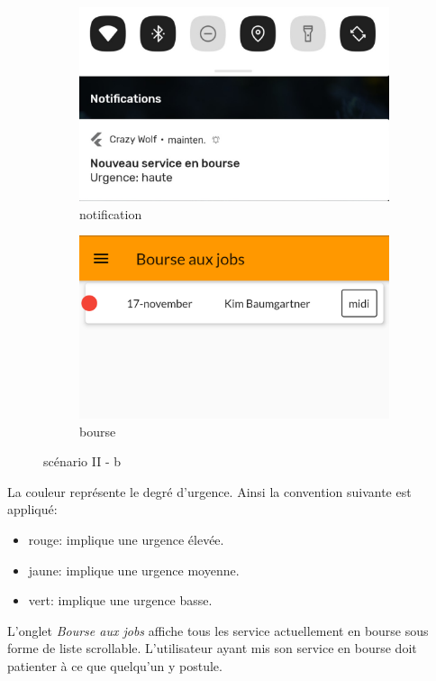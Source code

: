 \begin{figure}[!h]
    \centering
    \begin{subfigure}[]{.3\textwidth}
        \centering
        \includegraphics[width=0.9\linewidth]{screenshots/scenario_02/notification.png}
        \caption{notification}
        \label{fig:notif}
    \end{subfigure}
    \begin{subfigure}{.3\textwidth}
        \centering
        \includegraphics[width=0.9\linewidth]{screenshots/scenario_02/bourse_jobs.png}
        \caption{bourse}
        \label{fig:bourse}
    \end{subfigure}
    \caption{scénario II - b}
    \label{fig:scen02b}
\end{figure}

La couleur représente le degré d'urgence. Ainsi la convention suivante est appliqué:
\smallskip
\begin{itemize}
    \item rouge: implique une urgence élevée.
    \item jaune: implique une urgence moyenne.
    \item vert: implique une urgence basse.
\end{itemize}
\smallskip
L'onglet \textit{Bourse aux jobs} affiche tous les service actuellement en bourse sous
forme de liste scrollable. L'utilisateur ayant mis son service en bourse
doit patienter à ce que quelqu'un y postule.

